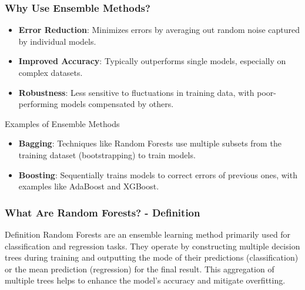 \documentclass[aspectratio=169]{beamer}
\begin{document}
\begin{frame}[fragile]
    \frametitle{Why Use Ensemble Methods?}
    \begin{itemize}
        \item \textbf{Error Reduction}: Minimizes errors by averaging out random noise captured by individual models.
        
        \item \textbf{Improved Accuracy}: Typically outperforms single models, especially on complex datasets.
        
        \item \textbf{Robustness}: Less sensitive to fluctuations in training data, with poor-performing models compensated by others.
    \end{itemize}
    
    \begin{block}{Examples of Ensemble Methods}
        \begin{itemize}
            \item \textbf{Bagging}: Techniques like Random Forests use multiple subsets from the training dataset (bootstrapping) to train models.
            \item \textbf{Boosting}: Sequentially trains models to correct errors of previous ones, with examples like AdaBoost and XGBoost.
        \end{itemize}
    \end{block}
\end{frame}

\begin{frame}[fragile]
  \frametitle{What Are Random Forests? - Definition}
  \begin{block}{Definition}
    Random Forests are an ensemble learning method primarily used for classification and regression tasks. They operate by constructing multiple decision trees during training and outputting the mode of their predictions (classification) or the mean prediction (regression) for the final result. This aggregation of multiple trees helps to enhance the model's accuracy and mitigate overfitting.
  \end{block}
\end{frame}
\end{document}
